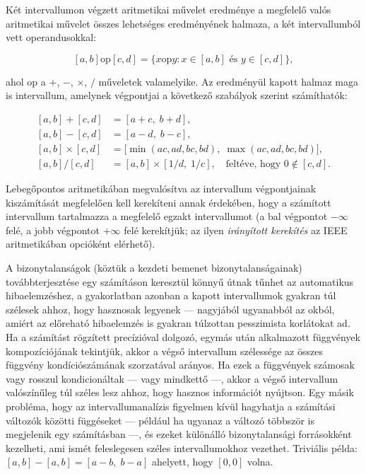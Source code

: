 \documentclass[
  magyar,
  11pt]{article}
\begin{document}
Két intervallumon végzett aritmetikai művelet eredménye a megfelelő
valós aritmetikai művelet összes lehetséges eredményének halmaza, a két
intervallumból vett operandusokkal:

\[[a, b] \mathbin{\mathrm{op}} [c, d] = \{x \mathbin{\mathrm{op}} y : x \in [a, b] \text{ és } y \in [c, d]\},\]

ahol \(\mathrm{op}\) a \(+\), \(-\), \(\times\), \(/\) műveletek
valamelyike. Az eredményül kapott halmaz maga is intervallum, amelynek
végpontjai a következő szabályok szerint számíthatók:

\[\begin{aligned}
[a, b] + [c, d] &= [a + c, \; b + d], \\
[a, b] - [c, d] &= [a - d, \; b - c], \\
[a, b] \times [c, d] &= \bigl[\min(ac, ad, bc, bd), \; \max(ac, ad, bc, bd)\bigr], \\
[a, b] / [c, d] &= [a, b] \times [1/d, \; 1/c], \quad \text{feltéve, hogy } 0 \notin [c, d].
\end{aligned}\]

Lebegőpontos aritmetikában megvalósítva az intervallum végpontjainak
kiszámítását megfelelően kell kerekíteni annak érdekében, hogy a
számított intervallum tartalmazza a megfelelő egzakt intervallumot (a
bal végpontot \(-\infty\) felé, a jobb végpontot \(+\infty\) felé
kerekítjük; az ilyen \emph{irányított kerekítés} az IEEE aritmetikában
opcióként elérhető).

A bizonytalanságok (köztük a kezdeti bemenet bizonytalanságainak)
továbbterjesztése egy számításon keresztül könnyű útnak tűnhet az
automatikus hibaelemzéshez, a gyakorlatban azonban a kapott
intervallumok gyakran túl szélesek ahhoz, hogy hasznosak legyenek ---
nagyjából ugyanabból az okból, amiért az előreható hibaelemzés is
gyakran túlzottan pesszimista korlátokat ad. Ha a számítást rögzített
precízióval dolgozó, egymás után alkalmazott függvények kompozíciójának
tekintjük, akkor a végső intervallum szélessége az összes függvény
kondíciószámának szorzatával arányos. Ha ezek a függvények számosak vagy
rosszul kondicionáltak --- vagy mindkettő ---, akkor a végső intervallum
valószínűleg túl széles lesz ahhoz, hogy hasznos információt nyújtson.
Egy másik probléma, hogy az intervallumanalízis figyelmen kívül
hagyhatja a számítási változók közötti függéseket --- például ha ugyanaz
a változó többször is megjelenik egy számításban ---, és ezeket
különálló bizonytalansági forrásokként kezelheti, ami ismét feleslegesen
széles intervallumokhoz vezethet. Triviális példa:
\([a, b] - [a, b] = [a - b, \; b - a]\) ahelyett, hogy \([0, 0]\) volna.
\end{document}
